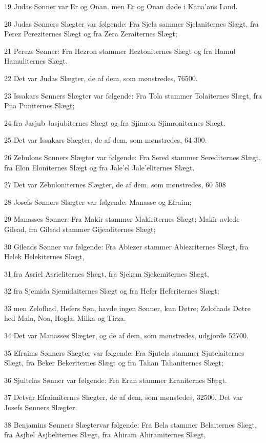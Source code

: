 \par 19 Judas Sønner var Er og Onan. men Er og Onan døde i Kana'ans Land.
\par 20 Judas Sønners Slægter var følgende: Fra Sjela sammer Sjelaniternes Slægt, fra Perez Pereziternes Slægt og fra Zera Zeraiternes Slægt;
\par 21 Perezs Sønner: Fra Hezron stammer Heztoniternes Slægt og fra Hamul Hamuliternes Slægt.
\par 22 Det var Judas Slægter, de af dem, som mønstredes, 76500.
\par 23 Issakars Sønners Slægter var følgende: Fra Tola stammer Tolaiternes Slægt, fra Pua Puniternes Slægt;
\par 24 fra Jasjub Jasjubiternes Slægt og fra Sjimron Sjimroniternes Slægt.
\par 25 Det var Issakars Slægter, de af dem, som mønstredes, 64 300.
\par 26 Zebulons Sønners Slægter var følgende: Fra Sered stammer Serediternes Slægt, fra Elon Eloniternes Slægt og fra Jale'el Jale'eliternes Slægt.
\par 27 Det var Zebuloniternes Slægter, de af dem, som mønstredes, 60 508
\par 28 Josefs Sønners Slægter var følgende: Manasse og Efraim;
\par 29 Manasses Sønner: Fra Makir stammer Makiriternes Slægt; Makir avlede Gilead, fra Gilead stammer Gijeaditernes Slægt;
\par 30 Gileads Sønner var følgende: Fra Abiezer stammer Abiezriternes Slægt, fra Helek Helekiternes Slægt,
\par 31 fra Asriel Asrieliternes Slægt, fra Sjekem Sjekemiternes Slægt,
\par 32 fra Sjemida Sjemidaiternes Slægt og fra Hefer Heferiternes Slægt;
\par 33 men Zelofhad, Hefers Søn, havde ingen Sønner, kun Døtre; Zelofhads Døtre hed Mala, Noa, Hogla, Milka og Tirza.
\par 34 Det var Manasses Slægter, og de af dem, som mønstredes, udgjorde 52700.
\par 35 Efraims Sønners Slægter var følgende: Fra Sjutela stammer Sjutelaiternes Slægt, fra Beker Bekeriternes Slægt og fra Tahan Tahaniternes Slægt;
\par 36 Sjultelas Sønner var følgende: Fra Eran stammer Eraniternes Slægt.
\par 37 Detvar Efraimiternes Slægter, de af dem, som mønstedes, 32500. Det var Josefs Sønners Slægter.
\par 38 Benjamins Sønners Slægtervar følgende: Fra Bela stammer Belaiternes Slægt, fra Asjbel Asjbeliternes Slægt, fra Ahiram Ahiramiternes Slægt,
